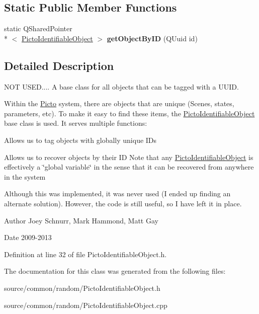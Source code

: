 \subsection*{Static Public Member Functions}
\begin{DoxyCompactItemize}
\item 
\hypertarget{class_picto_1_1_picto_identifiable_object_aee17e893b8c045be452b836f59a624b4}{static Q\-Shared\-Pointer\\*
$<$ \hyperlink{class_picto_1_1_picto_identifiable_object}{Picto\-Identifiable\-Object} $>$ {\bfseries get\-Object\-By\-I\-D} (Q\-Uuid id)}\label{class_picto_1_1_picto_identifiable_object_aee17e893b8c045be452b836f59a624b4}

\end{DoxyCompactItemize}


\subsection{Detailed Description}
N\-O\-T U\-S\-E\-D.... A base class for all objects that can be tagged with a U\-U\-I\-D. 

Within the \hyperlink{namespace_picto}{Picto} system, there are objects that are unique (Scenes, states, parameters, etc). To make it easy to find these items, the \hyperlink{class_picto_1_1_picto_identifiable_object}{Picto\-Identifiable\-Object} base class is used. It serves multiple functions\-:
\begin{DoxyEnumerate}
\item Allows us to tag objects with globally unique I\-Ds
\item Allows us to recover objects by their I\-D Note that any \hyperlink{class_picto_1_1_picto_identifiable_object}{Picto\-Identifiable\-Object} is effectively a \char`\"{}global variable\char`\"{} in the sense that it can be recovered from anywhere in the system
\end{DoxyEnumerate}

Although this was implemented, it was never used (I ended up finding an alternate solution). However, the code is still useful, so I have left it in place. \begin{DoxyAuthor}{Author}
Joey Schnurr, Mark Hammond, Matt Gay 
\end{DoxyAuthor}
\begin{DoxyDate}{Date}
2009-\/2013 
\end{DoxyDate}


Definition at line 32 of file Picto\-Identifiable\-Object.\-h.



The documentation for this class was generated from the following files\-:\begin{DoxyCompactItemize}
\item 
source/common/random/Picto\-Identifiable\-Object.\-h\item 
source/common/random/Picto\-Identifiable\-Object.\-cpp\end{DoxyCompactItemize}

